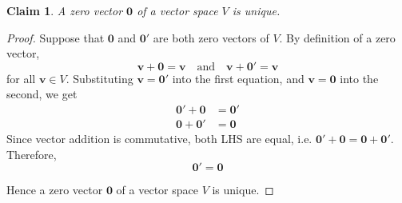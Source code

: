 \documentclass{article}
\newtheorem*{claim}{Claim}
\begin{document}
\begin{claim}
    A zero vector $\mathbf{0}$ of a vector space $V$ is unique.
\end{claim}

\begin{proof}
    Suppose that $\mathbf{0}$ and $\mathbf{0}'$ are both zero vectors of $V$. By definition of a zero vector,
    \[
    \mathbf{v} + \mathbf{0} = \mathbf{v} \quad \text{and} \quad \mathbf{v} + \mathbf{0}' = \mathbf{v}
    \]
    for all $\mathbf{v} \in V$. Substituting $\mathbf{v} = \mathbf{0}'$ into the first equation, and 
    $\mathbf{v} = \mathbf{0}$ into the second, we get
    \[
    \begin{aligned}
        \mathbf{0}' + \mathbf{0} &= \mathbf{0}' \\
        \mathbf{0} + \mathbf{0}' &= \mathbf{0}
    \end{aligned}
    \]
    Since vector addition is commutative, both LHS are equal, i.e. 
    $\mathbf{0}' + \mathbf{0} = \mathbf{0} + \mathbf{0}'$. Therefore,
    \[
    \mathbf{0}' = \mathbf{0}
    \]

    \medskip

    Hence a zero vector $\mathbf{0}$ of a vector space $V$ is unique.
\end{proof}
\end{document}
